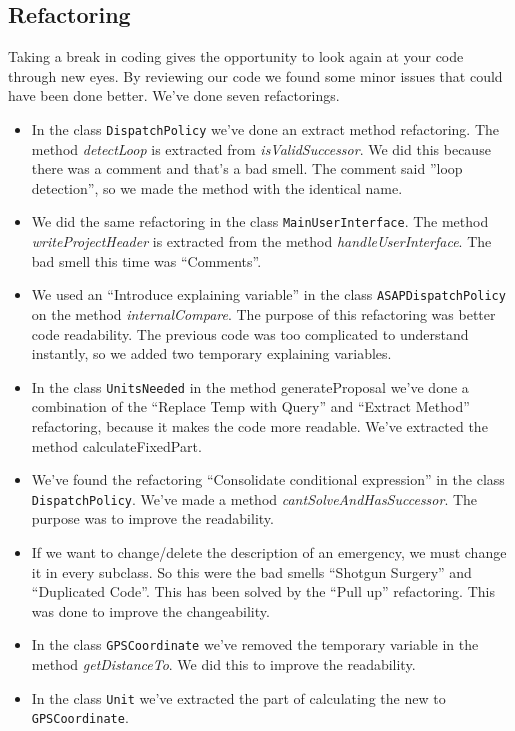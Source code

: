 \subsection{Refactoring}
Taking a break in coding gives the opportunity to look again at your code through new eyes. By reviewing our code we found some minor issues that could have been done better. We've done seven refactorings.
\begin{itemize}
	\item In the class \texttt{DispatchPolicy} we've done an extract method refactoring. The method \textit{detectLoop} is extracted from \textit{isValidSuccessor}. We did this because there was a comment and that's a bad smell. The comment said ''loop detection'', so we made the method with the identical name.
	\item We did the same refactoring in the class \texttt{MainUserInterface}. The method \textit{writeProjectHeader} is extracted from the method \textit{handleUserInterface}. The bad smell this time was ``Comments''.
	\item We used an ``Introduce explaining variable'' in the class \texttt{ASAPDispatchPolicy} on the method \textit{internalCompare}. The purpose of this refactoring was better code readability. The previous code was too complicated to understand instantly, so we added two temporary explaining variables.
	\item In the class \texttt{UnitsNeeded} in the method generateProposal we've done a combination of the ``Replace Temp with Query'' and ``Extract Method'' refactoring, because it makes the code more readable. We've extracted the method calculateFixedPart. 
	\item We've found the refactoring ``Consolidate conditional expression'' in the class \texttt{DispatchPolicy}. We've made a method \textit{cantSolveAndHasSuccessor}. The purpose was to improve the readability.
	\item If we want to change/delete the description of an emergency, we must change it in every subclass. So this were the bad smells ``Shotgun Surgery'' and ``Duplicated Code''. This has been solved by the ``Pull up'' refactoring. This was done to improve the changeability.
	\item In the class \texttt{GPSCoordinate} we've removed the temporary variable in the method \textit{getDistanceTo}. We did this to improve the readability.
	\item In the class \texttt{Unit} we've extracted the part of calculating the new  to \texttt{GPSCoordinate}.
\end{itemize}
